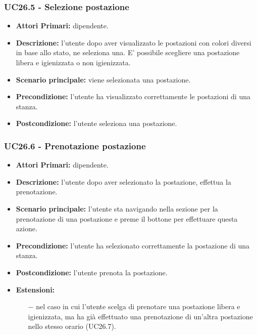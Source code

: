 \subsubsection{ UC26.5 - Selezione postazione }
\begin{itemize}
	\item\textbf{Attori Primari:} dipendente.
	\item\textbf{Descrizione:} l’utente dopo aver visualizzato le postazioni con colori diversi in base allo stato, ne seleziona una. E' possibile scegliere una postazione libera e igienizzata o non igienizzata.
	\item\textbf{Scenario principale:} viene selezionata una postazione.
	\item\textbf{Precondizione:} l’utente ha visualizzato correttamente le postazioni di una stanza.
	\item\textbf{Postcondizione:} l’utente seleziona una postazione.
\end{itemize}
\subsubsection{ UC26.6 - Prenotazione postazione }
\begin{itemize}
	\item\textbf{Attori Primari:} dipendente.
	\item\textbf{Descrizione:} l’utente dopo aver selezionato la postazione, effettua la prenotazione. 
	\item\textbf{Scenario principale:} l’utente sta navigando nella sezione per la prenotazione di una postazione
	e preme il bottone per effettuare questa azione.
	\item\textbf{Precondizione:} l’utente ha selezionato correttamente la postazione di una stanza.
	\item\textbf{Postcondizione:} l'utente prenota la postazione.
	\item\textbf{Estensioni:}
	\begin{itemize}
		\item[$-$] nel caso in cui l'utente scelga di prenotare una postazione libera e igienizzata, ma ha già effettuato una prenotazione di un'altra postazione nello stesso orario (UC26.7).
	\end{itemize}
\end{itemize}
